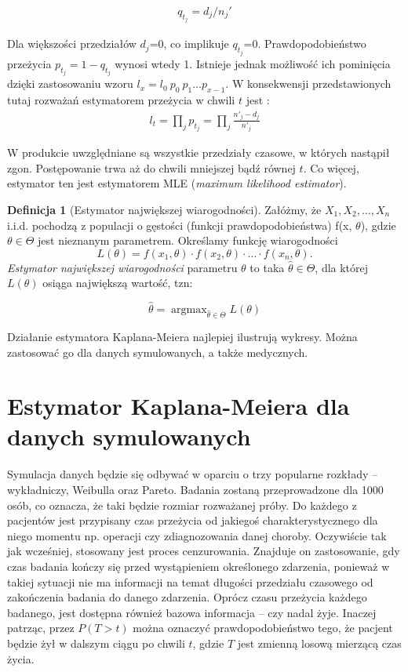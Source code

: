 \documentclass[licencjacka]{pwr_wmat_praca_dyplomowa}
\theoremstyle{plain}
\numberwithin{theorem}{chapter}
\theoremstyle{definition}
\numberwithin{theorem}{chapter}
\newtheorem{definition}[theorem]{Definicja}
\DeclareMathOperator*{\argmax}{argmax}
\begin{document}
\begin{align}
q_{t_j}=d_j/n_j'
\end{align}

Dla większości przedziałów $d_j$=0, co implikuje $q_{t_j}$=0. Prawdopodobieństwo przeżycia $p_{t_j}=1-q_{t_j}$ wynosi wtedy 1. Istnieje jednak możliwość ich pominięcia dzięki zastosowaniu wzoru $l_x=l_0 \ p_0 \ p_1\ldots p_{x-1}$. W konsekwensji przedstawionych tutaj rozważań estymatorem przeżycia w chwili $t$ jest \cite{smimr}: 
\begin{align}
l_t=\prod_{j}^{}p_{t_j}=\prod_{j}^{}\frac{n'_j-d_j}{n'_j}
\end{align}

W produkcie uwzględniane są wszystkie przedziały czasowe, w których nastąpił zgon. Postępowanie trwa aż do chwili mniejszej bądź równej $t$. Co więcej, estymator ten jest estymatorem MLE (\textit{maximum likelihood estimator}). 




\begin{definition}[Estymator największej wiarogodności] 
	Załóżmy, że $X_1,X_2, \ldots, X_n$ i.i.d. pochodzą z populacji o gęstości (funkcji prawdopodobieństwa) f(x, $\theta$), gdzie $\theta\in \Theta$ jest nieznanym parametrem. Określamy funkcję wiarogodności $$L(\theta)=f(x_1,\theta)\cdot f(x_2,\theta) \cdot \ldots\cdot f(x_n,\theta).$$
	\textit{Estymator największej wiarogodności} parametru $\theta$ to taka $\hat{\theta}\in \Theta$, dla której $L(\theta)$ osiąga największą wartość, tzn:
	
	\[\hat{\theta}=\argmax_{\hat{\theta}\in \Theta} L(\theta)\]
\end{definition}
 
 Działanie estymatora Kaplana-Meiera najlepiej ilustrują wykresy. Można zastosować go dla danych symulowanych, a także medycznych. 
 
 
\section{Estymator Kaplana-Meiera dla danych symulowanych}
 

 Symulacja danych będzie się odbywać w oparciu o trzy popularne rozkłady -- wykładniczy, Weibulla oraz Pareto. Badania zostaną przeprowadzone dla 1000 osób, co oznacza, że taki będzie rozmiar rozważanej próby. Do każdego z pacjentów jest przypisany czas przeżycia od jakiegoś charakterystycznego dla niego momentu np. operacji czy zdiagnozowania danej choroby. Oczywiście tak jak wcześniej, stosowany jest proces cenzurowania. Znajduje on zastosowanie, gdy czas badania kończy się przed wystąpieniem określonego zdarzenia, ponieważ w takiej sytuacji nie ma informacji na temat długości przedziału czasowego od zakończenia badania do danego zdarzenia. Oprócz czasu przeżycia każdego badanego, jest dostępna również bazowa informacja -- czy nadal żyje.
 Inaczej patrząc, przez $P(T>t)$ można oznaczyć prawdopodobieństwo tego, że pacjent będzie żył w dalszym ciągu po chwili $t$, gdzie $T$ jest zmienną losową mierzącą czas życia. 
 
\end{document}

